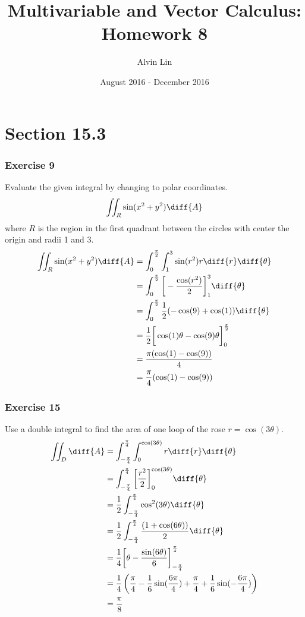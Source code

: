 \documentclass{math}
\title{Multivariable and Vector Calculus: Homework 8}
\author{Alvin Lin}
\date{August 2016 - December 2016}
\begin{document}
\maketitle

\section*{Section 15.3}

\subsubsection*{Exercise 9}
Evaluate the given integral by changing to polar coordinates.
\[ \iint_{R}\sin(x^2+y^2)\diff{A} \]
where \( R \) is the region in the first quadrant between the circles with
center the origin and radii 1 and 3.
\begin{align*}
  \iint_R\sin(x^2+y^2)\diff{A} &=
    \int_{0}^{\frac{\pi}{2}}\int_{1}^{3}\sin(r^2)r\diff{r}\diff{\theta} \\
  &= \int_{0}^{\frac{\pi}{2}}\bigg[-\frac{\cos(r^2)}{2}\bigg]_{1}^{3}
    \diff{\theta} \\
  &= \int_{0}^{\frac{\pi}{2}}\frac{1}{2}(-\cos(9)+\cos(1))\diff{\theta} \\
  &= \frac{1}{2}\bigg[\cos(1)\theta-\cos(9)\theta\bigg]_{0}^{\frac{\pi}{2}} \\
  &= \frac{\pi(\cos(1)-\cos(9))}{4} \\
  &= \frac{\pi}{4}(\cos(1)-\cos(9))
\end{align*}

\subsubsection*{Exercise 15}
Use a double integral to find the area of one loop of the rose
\( r = \cos(3\theta) \).
\begin{align*}
  \iint_{D}\diff{A} &= \int_{-\frac{\pi}{4}}^{\frac{\pi}{4}}
    \int_{0}^{\cos(3\theta)}r\diff{r}\diff{\theta} \\
  &= \int_{-\frac{\pi}{4}}^{\frac{\pi}{4}}
    \bigg[\frac{r^2}{2}\bigg]_{0}^{\cos(3\theta)}\diff{\theta} \\
  &= \frac{1}{2}\int_{-\frac{\pi}{4}}^{\frac{\pi}{4}}
    \cos^2(3\theta)\diff{\theta} \\
  &= \frac{1}{2}\int_{-\frac{\pi}{4}}^{\frac{\pi}{4}}
    \frac{(1+\cos(6\theta))}{2}\diff{\theta} \\
  &= \frac{1}{4}\bigg[
    \theta-\frac{\sin(6\theta)}{6}\bigg]_{-\frac{\pi}{4}}^{\frac{\pi}{4}} \\
  &= \frac{1}{4}\left(\frac{\pi}{4}-\frac{1}{6}\sin(\frac{6\pi}{4})+
    \frac{\pi}{4}+\frac{1}{6}\sin(-\frac{6\pi}{4})\right) \\
  &= \frac{\pi}{8}
\end{align*}
\end{document}
